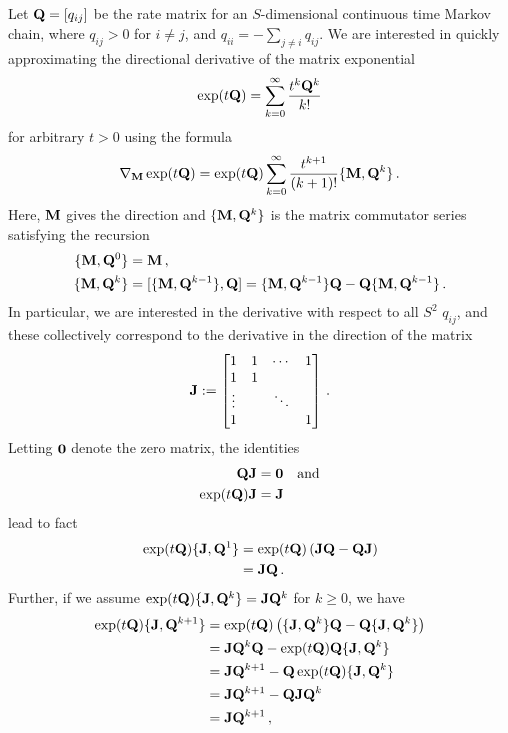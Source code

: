 \documentclass[12pt]{article} %
\begin{document}
Let $\mathbf{Q}=[q_{ij}]$ be the rate matrix for an $S$-dimensional continuous time Markov chain, where $q_{ij}>0$ for $i\neq j$, and $q_{ii} = -\sum_{j\neq i} q_{ij}$.  We are interested in quickly approximating the directional derivative of the matrix exponential
\begin{align*}
	\exp(t\mathbf{Q}) = \sum_{k=0}^\infty \frac{t^k\mathbf{Q}^k}{k!}
\end{align*}
for arbitrary $t>0$ using the formula \citep{najfeld1995derivatives}
\begin{align}\label{eq:deriv}
	\nabla_{\mathbf{M}} \exp(t\mathbf{Q})  =  \exp(t\mathbf{Q})  \sum_{k=0}^\infty \frac{t^{k+1}}{(k+1)!} \{\mathbf{M},\mathbf{Q}^k\} \, .
\end{align}
Here, $\mathbf{M}$ gives the direction and $\{\mathbf{M},\mathbf{Q}^k\}$ is the matrix commutator series satisfying the recursion
\begin{align*}
	\{\mathbf{M},\mathbf{Q}^0\} &= \mathbf{M} \, , \\ 
	\{\mathbf{M},\mathbf{Q}^k\} &= [\{\mathbf{M},\mathbf{Q}^{k-1}\} , \mathbf{Q}]  = \{\mathbf{M},\mathbf{Q}^{k-1}\} \mathbf{Q} - \mathbf{Q} \{\mathbf{M},\mathbf{Q}^{k-1}\} \, .
\end{align*}
In particular, we are interested in the derivative with respect to all $S^2$ $q_{ij}$, and these collectively correspond to the derivative in the direction of the matrix
\begin{align*}
\mathbf{J} := \begin{bmatrix}
	1 & 1 &\cdots & 1 \\
1&	1 &   & \\
\vdots && \ddots& \\
	1 & &  & 1 
	\end{bmatrix}  \, .
\end{align*}
Letting $\boldsymbol{0}$ denote the zero matrix, the identities
\begin{align*}
\mathbf{Q}\mathbf{J}&=\boldsymbol{0} \quad \mbox{and}\\
\exp(t\mathbf{Q}) \mathbf{J} &= \mathbf{J} 
\end{align*}
lead to fact
\begin{align*}
 \exp(t\mathbf{Q})	\{\mathbf{J} , \mathbf{Q}^1\} &=  \exp(t\mathbf{Q})	\left( \mathbf{J}  \mathbf{Q} - \mathbf{Q} \mathbf{J}     \right) \\
&= \mathbf{J} \mathbf{Q} \, .
\end{align*} 
Further, if we assume $ \exp(t\mathbf{Q})	\{\mathbf{J} , \mathbf{Q}^{k}\} = \mathbf{J}\mathbf{Q}^{k} $ for $k\geq0$, we have
\begin{align*}
 \exp(t\mathbf{Q})	\{\mathbf{J} , \mathbf{Q}^{k+1}\} &= \exp(t\mathbf{Q})  \left( 	\{\mathbf{J} , \mathbf{Q}^{k}\} \mathbf{Q} - \mathbf{Q} 	\{\mathbf{J} , \mathbf{Q}^{k}\} \right)  \\
 &= \mathbf{J}\mathbf{Q}^{k} \mathbf{Q} - \exp(t\mathbf{Q}) \mathbf{Q} 	\{\mathbf{J} , \mathbf{Q}^{k}\} \\
 &= \mathbf{J}\mathbf{Q}^{k+1}  - \mathbf{Q} \exp(t\mathbf{Q})  \{\mathbf{J} , \mathbf{Q}^{k}\} \\ 
 &= \mathbf{J}\mathbf{Q}^{k+1} - \mathbf{Q} \mathbf{J} \mathbf{Q}^k \\
 &= \mathbf{J} \mathbf{Q}^{k+1} \, ,
\end{align*}
\end{document}

